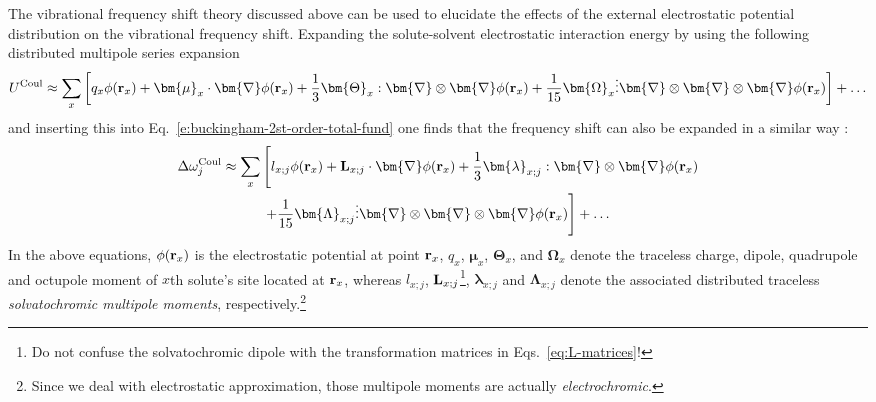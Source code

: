 \documentclass[a4paper,titlepage,twoside,fleqn,12pt]{book}
\newcommand{\BM}[1]{\bm{#1}}
\begin{document}
\begin{refsection}
The vibrational frequency shift theory discussed above 
can be used
to elucidate the effects of the external electrostatic 
potential distribution on the vibrational frequency shift.
Expanding the solute-solvent electrostatic interaction energy by using the
following distributed multipole series 
expansion \citep{Stone.TheTheoryOfIntermolecularForces.1996}
%
\begin{equation} \label{e:dmtp}
 U^{\rm Coul} \approx  \sum_x \left[ q_x \phi({\bf r}_x) + 
                  {\BM \mu}_x \cdot {\BM \nabla} \phi({\bf r}_x)   + 
      \frac{1}{3} {\BM \Theta}_x : {\BM \nabla} \otimes {\BM \nabla} \phi({\bf r}_x)   + 
     \frac{1}{15} {\BM \Omega}_x \vdots {\BM \nabla} \otimes {\BM \nabla} \otimes {\BM \nabla} \phi({\bf r}_x) \right] + \ldots
\end{equation}
%
and inserting this into Eq.~\eqref{e:buckingham-2st-order-total-fund} 
one finds that the frequency shift can also be expanded
in a similar way \citep{Cho.JCP.2009}:
%
\begin{multline} \label{e:dmtp-sol}
 \Delta\omega_j^{\rm Coul} \approx  \sum_x \Bigg[ l_{x;j} \phi({\bf r}_x) + 
                        {\bf L}_{x;j} \cdot {\BM \nabla} \phi({\bf r}_x)   + 
      \frac{1}{3} {\BM \lambda}_{x;j} : {\BM \nabla} \otimes {\BM \nabla} \phi({\bf r}_x)   \\ + 
     \frac{1}{15} {\BM \Lambda}_{x;j} \vdots {\BM \nabla} \otimes {\BM \nabla} \otimes {\BM \nabla} \phi({\bf r}_x) \Bigg] + \ldots
\end{multline}
%
In the above equations, $\phi({\bf r}_x)$ is the electrostatic
potential at point ${\bf r}_x$,
$q_x$, ${\BM \mu}_x$, ${\BM \Theta}_x$, and ${\BM \Omega}_x$ 
denote the traceless charge, dipole, quadrupole and octupole moment 
of $x$th solute's site located at ${\bf r}_x$, whereas 
$l_{x;j}$, ${\bf L}_{x;j}$\footnote{Do not confuse the solvatochromic
dipole with the transformation matrices in Eqs.~\eqref{eq:L-matrices}!}, 
${\BM \lambda}_{x;j}$ and ${\BM \Lambda}_{x;j}$ 
denote the associated distributed traceless
\emph{solvatochromic multipole moments}, respectively.\footnote{Since we deal with 
electrostatic approximation, those multipole moments are actually \emph{electrochromic}.}


\end{refsection}
\end{document}
